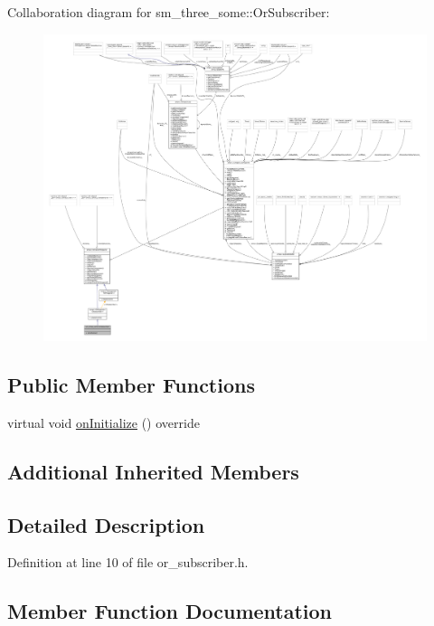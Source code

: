 Collaboration diagram for sm\+\_\+three\+\_\+some\+:\+:Or\+Subscriber\+:
\nopagebreak
\begin{figure}[H]
\begin{center}
\leavevmode
\includegraphics[width=350pt]{classsm__three__some_1_1OrSubscriber__coll__graph}
\end{center}
\end{figure}
\subsection*{Public Member Functions}
\begin{DoxyCompactItemize}
\item 
virtual void \hyperlink{classsm__three__some_1_1OrSubscriber_af1362388fc43c43a38d75542931e348a}{on\+Initialize} () override
\end{DoxyCompactItemize}
\subsection*{Additional Inherited Members}


\subsection{Detailed Description}


Definition at line 10 of file or\+\_\+subscriber.\+h.



\subsection{Member Function Documentation}
\mbox{\label{classsm__three__some_1_1OrSubscriber_af1362388fc43c43a38d75542931e348a}} 
